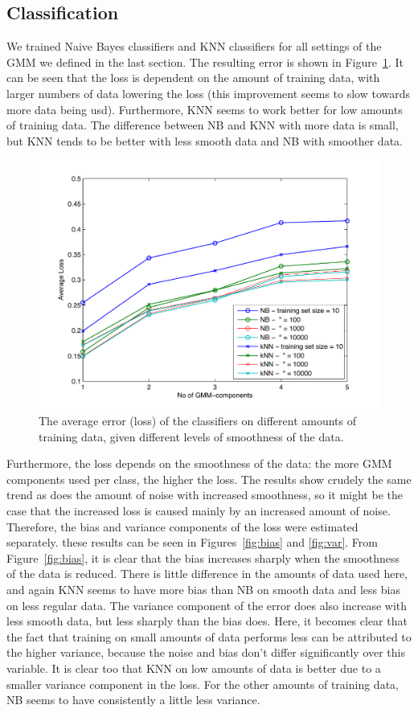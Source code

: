 \documentclass[a4paper]{article}
\begin{document}
\subsection{Classification}
We trained Naive Bayes classifiers and KNN classifiers for all settings of the \ac{GMM} we defined in the last section. The resulting error is shown in Figure~\ref{fig:loss}. It can be seen that the loss is dependent on the amount of training data, with larger numbers of data lowering the loss (this improvement seems to slow towards more data being usd). Furthermore, KNN seems to work better for low amounts of training data. The difference between NB and KNN with more data is small, but KNN tends to be better with less smooth data and NB with smoother data.

\begin{figure}[htb]
    \centering
    \includegraphics[width=.9\textwidth]{loss_vs.pdf}
    \caption{The average error (loss) of the classifiers on different amounts of training data, given different levels of smoothness of the data. \label{fig:loss}}
\end{figure}

Furthermore, the loss depends on the smoothness of the data: the more GMM components used per class, the higher the loss. The results show crudely the same trend as does the amount of noise with increased smoothness, so it might be the case that the increased loss is caused mainly by an increased amount of noise. Therefore, the bias and variance components of the loss were estimated separately. these results can be seen in Figures~\ref{fig:bias} and \ref{fig:var}. From Figure~\ref{fig:bias}, it is clear that the bias increases sharply when the smoothness of the data is reduced. There is little difference in the amounts of data used here, and again KNN seems to have more bias than NB on smooth data and less bias on less regular data. The variance component of the error does also increase with less smooth data, but less sharply than the bias does. Here, it becomes clear that the fact that training on small amounts of data performs less can be attributed to the higher variance, because the noise and bias don't differ significantly over this variable. It is clear too that KNN on low amounts of data is better due to a smaller variance component in the loss. For the other amounts of training data, NB seems to have consistently a little less variance.
\end{document}

